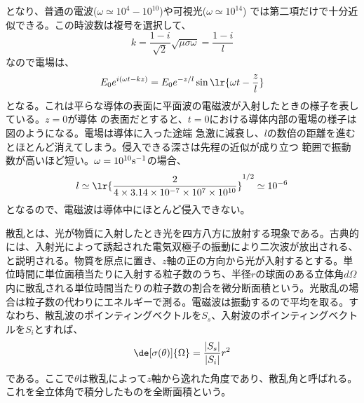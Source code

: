         となり、普通の電波($\omega \simeq 10^4-10^{10}$)や可視光($\omega \simeq 10^{14}$)
        では第二項だけで十分近似できる。この時波数は複号を選択して、
            \[k = \frac{1 - i}{\sqrt{2}}\sqrt{\mu\sigma\omega} = \frac{1 - i}{l}\]
        なので電場は、
            \[E_0e^{i(\omega t - kz)} = E_0e^{-z/l}\sin\lr{\omega t - \frac{z}{l}}\]
        となる。これは平らな導体の表面に平面波の電磁波が入射したときの様子を表している。$z = 0$が導体
        の表面だとすると、$t = 0$における導体内部の電場の様子は図のようになる。電場は導体に入った途端
        急激に減衰し、$l$の数倍の距離を進むとほとんど消えてしまう。侵入できる深さは先程の近似が成り立つ
        範囲で振動数が高いほど短い。$\omega = 10^{10}{\rm s^{-1}}$の場合、
            \[l \simeq \lr{\frac{2}{4\times 3.14\times 10^{-7}\times 10^7\times 10^{10}}}^{1/2}
            \simeq 10^{-6}\]
        となるので、電磁波は導体中にほとんど侵入できない。

    散乱とは、光が物質に入射したとき光を四方八方に放射する現象である。古典的には、入射光によって誘起された電気双極子の振動により二次波が放出される、と説明される。物質を原点に置き、$z$軸の正の方向から光が入射するとする。単位時間に単位面積当たりに入射する粒子数のうち、半径$r$の球面のある立体角$d\Omega$内に散乱される単位時間当たりの粒子数の割合を微分断面積という。光散乱の場合は粒子数の代わりにエネルギーで測る。電磁波は振動するので平均を取る。すなわち、散乱波のポインティングベクトルを$S_s$、入射波のポインティングベクトルを$S_i$とすれば、
        \[\de[\sigma(\theta)]{\Omega} = \frac{|S_s|}{|S_i|}r^2\]
    である。ここで$\theta$は散乱によって$z$軸から逸れた角度であり、散乱角と呼ばれる。これを全立体角で積分したものを全断面積という。
